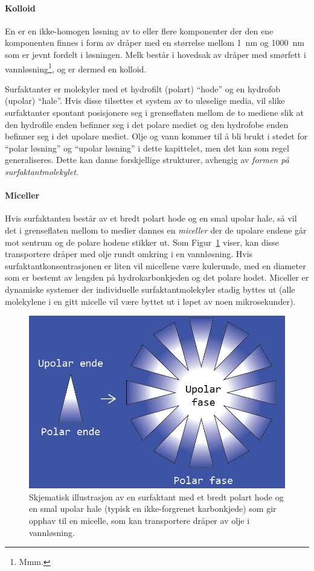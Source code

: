 
\paragraph{Kolloid} En  er en ikke-homogen løsning av to eller flere komponenter der den ene komponenten finnes i form av dråper med en størrelse mellom \SI{1}{\nano\meter} og \SI{1000}{\nano\meter} som er jevnt fordelt i løsningen. Melk består i hovedsak av dråper med smørfett i vannløsning\footnote{Mmm.}, og er dermed en kolloid.

Surfaktanter er molekyler med et hydrofilt (polart) ``hode'' og en hydrofob (upolar) ``hale''. Hvis disse tilsettes et system av to uløselige media, vil slike surfaktanter spontant posisjonere seg i grenseflaten mellom de to mediene slik at den hydrofile enden befinner seg i det polare mediet og den hydrofobe enden befinner seg i det upolare mediet. Olje og vann kommer til å bli brukt i stedet for ``polar løsning'' og ``upolar løsning'' i dette kapittelet, men det kan som regel generaliseres. Dette kan danne forskjellige strukturer, avhengig av \emph{formen på surfaktantmolekylet}. 

\paragraph{Miceller} Hvis surfaktanten består av et bredt polart hode og en smal upolar hale, så vil det i grenseflaten mellom to medier dannes en \emph{miceller} der de upolare endene går mot sentrum og de polare hodene stikker ut. Som Figur~\ref{fig:micelle} viser, kan disse transportere dråper med olje rundt omkring i en vannløsning. Hvis surfaktantkonsentrasjonen er liten vil micellene være kulerunde, med en diameter som er bestemt av lengden på hydrokarbonkjeden og det polare hodet. Miceller er dynamiske systemer der individuelle surfaktantmolekyler stadig byttes ut (alle molekylene i en gitt micelle vil være byttet ut i løpet av noen mikrosekunder).
\begin{figure}[H]
	\bmd\centering
	\includegraphics[width=0.8\linewidth]{micelle.png}
	\caption{Skjematisk illustrasjon av en surfaktant med et bredt polart hode og en smal upolar hale (typisk en ikke-forgrenet karbonkjede) som gir opphav til en micelle, som kan transportere dråper av olje i vannløsning.}
	\label{fig:micelle}
\emd\end{figure}

